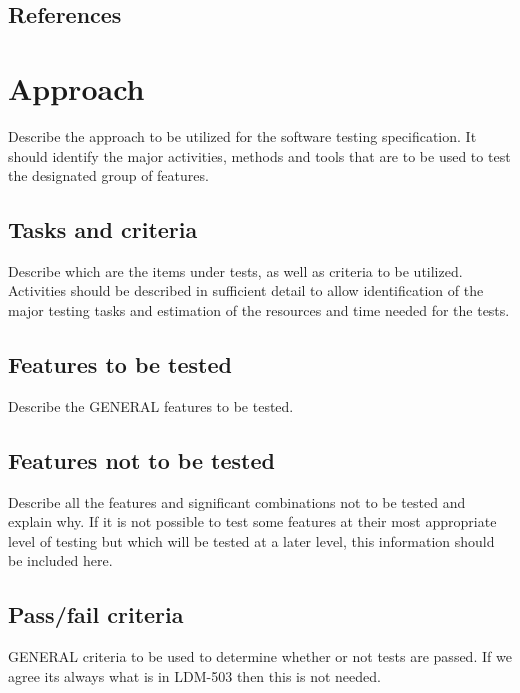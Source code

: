 \documentclass[DM,lsstdraft,STS,toc]{lsstdoc}
\begin{document}
\subsection{References\label{sect:references}}
\renewcommand{\refname}{}


\section{Approach}
\label{sec:approach}

Describe the approach to be utilized for the software testing specification. It should identify the major activities, methods and tools that are to be used to test the designated group of features.

\subsection{Tasks and criteria}
\label{sec:tasks}

Describe which are the items under tests, as well as criteria to be utilized. Activities should be described in sufficient detail to allow identification of the major testing tasks and estimation of the resources and time needed for the tests.

\subsection{Features to be tested}
\label{sec:feat2test}

Describe the GENERAL features to be tested.

\subsection{Features not to be tested}
\label{sec:featnot2test}

Describe all the features and significant combinations not to be tested and explain why. If it is not possible to test some features at their most appropriate level of testing but which will be tested at a later level, this information should be included here.

\subsection{Pass/fail criteria}
\label{sec:passfail}

GENERAL criteria to be used to determine whether or not tests are passed. If we agree its always what is in LDM-503 then this is not needed.
\end{document}
